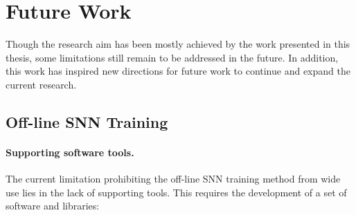%



\section{Future Work}
Though the research aim has been mostly achieved by the work presented in this thesis, some limitations still remain to be addressed in the future.
In addition, this work has inspired new directions for future work to continue and expand the current research.

\subsection{Off-line SNN Training}

\paragraph{Supporting software tools.}
The current limitation prohibiting the off-line SNN training method from wide use lies in the lack of supporting tools.
This requires the development of a set of software and libraries:

